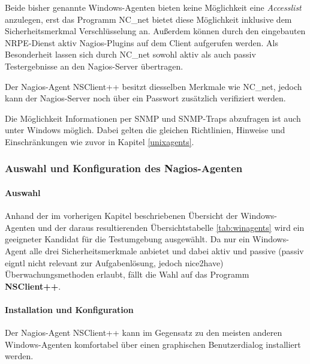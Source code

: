 Beide bisher genannte Windows-Agenten bieten keine Möglichkeit eine \textit{Accesslist} anzulegen, erst das Programm NC\_net bietet diese Möglichkeit inklusive dem Sicherheitsmerkmal Verschlüsselung an.
Außerdem können durch den eingebauten \gls{NRPE}-Dienst aktiv Nagios-Plugins auf dem Client aufgerufen werden.
Als Besonderheit lassen sich durch NC\_net sowohl aktiv als auch passiv Testergebnisse an den Nagios-Server übertragen. 

Der Nagios-Agent NSClient++ besitzt diesselben Merkmale wie NC\_net, jedoch kann der Nagios-Server noch über ein Passwort zusätzlich verifiziert werden.

Die Möglichkeit Informationen per \gls{SNMP} und \gls{SNMP}-Traps abzufragen ist auch unter Windows möglich.
Dabei gelten die gleichen Richtlinien, Hinweise und Einschränkungen wie zuvor in Kapitel \ref{unixagents}.

\subsubsection{Auswahl und Konfiguration des Nagios-Agenten}

\paragraph{Auswahl}
Anhand der im vorherigen Kapitel beschriebenen Übersicht der Windows-Agenten und der daraus resultierenden Übersichtstabelle \ref{tab:winagents} wird ein geeigneter Kandidat für die Testumgebung ausgewählt.
Da nur ein Windows-Agent alle drei Sicherheitsmerkmale anbietet und dabei aktiv und passive (passiv eigntl nicht relevant zur Aufgabenlösung, jedoch nice2have) Überwachungsmethoden erlaubt, fällt die Wahl auf das Programm \textbf{NSClient++}.

\paragraph{Installation und Konfiguration}

Der Nagios-Agent NSClient++ kann im Gegensatz zu den meisten anderen Windows-Agenten komfortabel über einen graphischen Benutzerdialog installiert werden.

